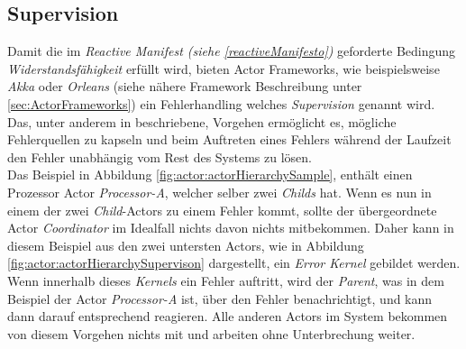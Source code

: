 \subsection{Supervision}\label{actor:supervision}
Damit die im \textit{Reactive Manifest (siehe \ref{reactiveManifesto})} geforderte Bedingung \textit{Widerstandsfähigkeit} erfüllt wird, bieten Actor Frameworks, wie beispielsweise \textit{Akka} oder \textit{Orleans} (siehe nähere Framework Beschreibung unter \ref{sec:ActorFrameworks}) ein Fehlerhandling welches \textit{Supervision} genannt wird. Das, unter anderem in \cite{sargent2016play} beschriebene, Vorgehen ermöglicht es, mögliche Fehlerquellen zu kapseln und beim Auftreten eines Fehlers während der Laufzeit den Fehler unabhängig vom Rest des Systems zu lösen.\\
Das Beispiel in Abbildung \ref{fig:actor:actorHierarchySample}, enthält  einen Prozessor Actor \textit{Processor-A}, welcher selber zwei \textit{Childs} hat. Wenn es nun in einem der zwei \textit{Child}-Actors zu einem Fehler kommt, sollte der übergeordnete Actor \textit{Coordinator} im Idealfall nichts davon nichts mitbekommen. Daher kann in diesem Beispiel aus den zwei untersten Actors, wie in Abbildung \ref{fig:actor:actorHierarchySupervison} dargestellt, ein \textit{Error Kernel} gebildet werden. Wenn innerhalb dieses \textit{Kernels} ein Fehler auftritt, wird der \textit{Parent}, was in dem Beispiel der Actor \textit{Processor-A} ist, über den Fehler benachrichtigt, und kann dann darauf entsprechend reagieren. Alle anderen Actors im System bekommen von diesem Vorgehen nichts mit und arbeiten ohne Unterbrechung weiter. \\
